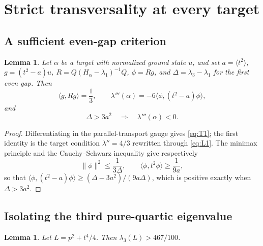 \documentclass[11pt,reqno]{amsart}
\theoremstyle{plain}
\newtheorem{lemma}[theorem]{Lemma}
\theoremstyle{definition}
\theoremstyle{remark}
\numberwithin{equation}{section}
\begin{document}
\section{Strict transversality at every target}
\label{sec:transversality}

\subsection{A sufficient even-gap criterion}

\begin{lemma}
  \label{lem:gap-criterion}
  Let $\alpha$ be a target with normalized ground state $u$, and set
  $a=\langle t^2\rangle$, $g=(t^2-a)u$, $R=Q(H_\alpha-\lambda_1)^{-1}Q$,
  $\phi=Rg$, and $\Delta=\lambda_3-\lambda_1$ for the first even gap. Then
  \begin{equation}
    \label{eq:T1}
    \langle g,Rg\rangle=\frac13,
    \qquad
    \lambda'''(\alpha)=-6\langle\phi,(t^2-a)\phi\rangle,
  \end{equation}
  and
  \begin{equation}
    \label{eq:transversality}
    \Delta>3a^2
    \quad\Longrightarrow\quad
    \lambda'''(\alpha)<0 .
  \end{equation}
\end{lemma}

\begin{proof}
  Differentiating in the parallel-transport gauge gives \eqref{eq:T1}; the
  first identity is the target condition $\lambda''=4/3$ rewritten through
  \eqref{eq:L1}. The minimax principle and the Cauchy--Schwarz inequality
  give respectively
  \begin{equation}
    \label{eq:T2}
    \lVert\phi\rVert^2\le\frac1{3\Delta},
    \qquad
    \langle\phi,t^2\phi\rangle\ge\frac1{9a},
  \end{equation}
  so that
  $\langle\phi,(t^2-a)\phi\rangle\ge(\Delta-3a^2)/(9a\Delta)$, which is
  positive exactly when $\Delta>3a^2$.
\end{proof}

\subsection{Isolating the third pure-quartic eigenvalue}

\begin{lemma}
  \label{lem:quartic}
  Let $L=p^2+t^4/4$. Then $\lambda_3(L)>467/100$.
\end{lemma}
\end{document}
